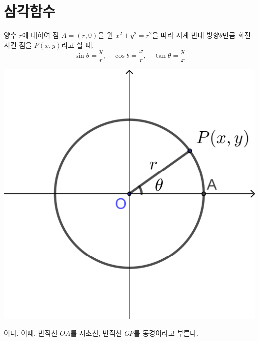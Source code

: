 \documentclass{oblivoir}
\begin{document}
\section{삼각함수}
\begin{mdframed}
%
\label{tfunction1}
\noindent\begin{minipage}{.75\textwidth}
양수 \(r\)에 대하여 점 \(A=(r,0)\)을 원 \(x^2+y^2=r^2\)을 따라 시계 반대 방향 \(\theta\)만큼 회전시킨 점을 \(P(x,y)\)라고 할 때,
\[\sin\theta=\frac yr,\quad\cos\theta=\frac xr,\quad\tan\theta=\frac yx\]
\end{minipage}
\begin{minipage}{.25\textwidth}
\centering
\vspace{10pt}
\includegraphics[width=.9\textwidth]{tfunction_1}
\vspace{10pt}
\end{minipage}
이다.
이때, 반직선 \(OA\)를 시초선, 반직선 \(OP\)를 동경이라고 부른다.
\end{mdframed}
\end{document}

